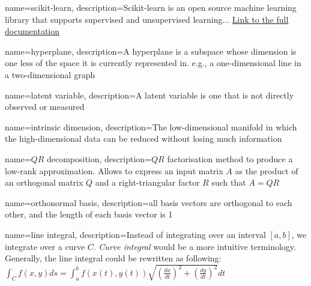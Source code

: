 

{
    name=scikit-learn,
    description={Scikit-learn is an open source machine learning library that supports supervised and unsupervised learning... \href{https://scikit-learn.org/stable/getting_started.html}{Link to the full documentation}}
}

{
    name=hyperplane,
    description={A hyperplane is a subspace whose dimension is one less of the space it is currently represented in. e.g., a one-dimensional line in a two-dimensional graph}
}

{
    name=latent variable,
    description={A latent variable is one that is not directly observed or measured \cite{rosipal2005overview}}
}

{
    name=intrinsic dimension,
    description={The low-dimensional manifold in which the high-dimensional data can be reduced without losing much information \cite{GeometricStructureWangCh1}}
}

{
    name=$QR$ decomposition,
    description={$QR$ factorisation method to produce a low-rank approximation. Allows to express an input matrix $A$ as the product of an orthogonal matrix $Q$ and a right-triangular factor $R$ such that $A = QR$ \cite{duersch2017randomized}}
}

{
    name=orthonormal basis,
    description={all basis vectors are orthogonal to each other, and the length of each basis vector is 1 \cite{deisenroth2020mathematics}}
}

{
    name=line integral,
    description={Instead of integrating over an interval $[a,b]$, we integrate over a curve $C$.
    \emph{Curve integral} would be a more intuitive terminology. Generally, the line integral could be rewritten as following:\medskip
    \\
    $\int_C f(x,y) ds = \int_a^b f(x(t), y(t)) \sqrt{(\frac{dx}{dt})^2 + (\frac{dy}{dt})^2} dt$
    \quad \cite{stewart2016calculus}}
}

